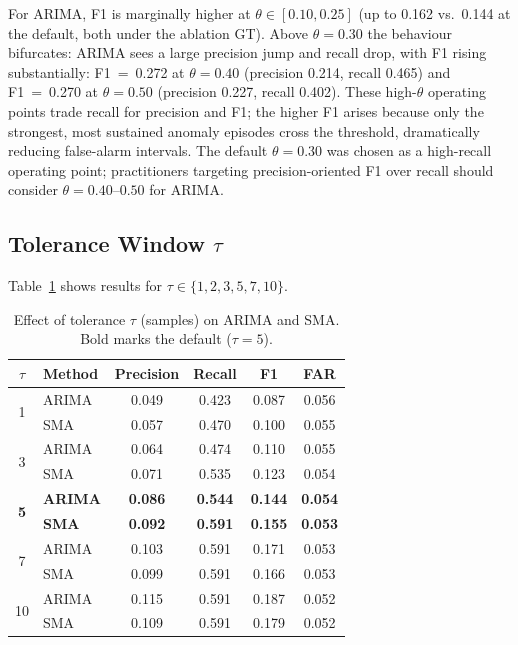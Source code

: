 \documentclass[pdflatex,sn-nature]{sn-jnl}
\theoremstyle{thmstyleone}%
\begin{document}
For ARIMA, F1 is marginally higher at $\theta \in [0.10, 0.25]$
(up to 0.162 vs.\ 0.144 at the default, both under the ablation GT).
Above $\theta = 0.30$ the behaviour bifurcates:
ARIMA sees a large precision jump and recall drop, with F1 rising substantially:
F1~=~0.272 at $\theta=0.40$ (precision 0.214, recall 0.465) and
F1~=~0.270 at $\theta=0.50$ (precision 0.227, recall 0.402).
These high-$\theta$ operating points trade recall for precision and F1;
the higher F1 arises because only the strongest, most sustained anomaly
episodes cross the threshold, dramatically reducing false-alarm intervals.
The default $\theta = 0.30$ was chosen as a high-recall operating point;
practitioners targeting precision-oriented F1 over recall should consider
$\theta = 0.40$--$0.50$ for ARIMA.

\subsection{Tolerance Window \texorpdfstring{$\tau$}{tau}}\label{sec:ablation:tau}

Table~\ref{tab:ablation_tau} shows results for $\tau \in \{1, 2, 3, 5, 7, 10\}$.

\begin{table}[tbp]
\centering
\begin{tabular}{clcccc}
\toprule
$\tau$ & Method & Precision & Recall & F1 & FAR \\
\midrule
\multirow{2}{*}{1}  & ARIMA & 0.049 & 0.423 & 0.087 & 0.056 \\
                    & SMA   & 0.057 & 0.470 & 0.100 & 0.055 \\
\multirow{2}{*}{3}  & ARIMA & 0.064 & 0.474 & 0.110 & 0.055 \\
                    & SMA   & 0.071 & 0.535 & 0.123 & 0.054 \\
\multirow{2}{*}{\textbf{5}}  & \textbf{ARIMA} & \textbf{0.086} & \textbf{0.544} & \textbf{0.144} & \textbf{0.054} \\
                    & \textbf{SMA}   & \textbf{0.092} & \textbf{0.591} & \textbf{0.155} & \textbf{0.053} \\
\multirow{2}{*}{7}  & ARIMA & 0.103 & 0.591 & 0.171 & 0.053 \\
                    & SMA   & 0.099 & 0.591 & 0.166 & 0.053 \\
\multirow{2}{*}{10} & ARIMA & 0.115 & 0.591 & 0.187 & 0.052 \\
                    & SMA   & 0.109 & 0.591 & 0.179 & 0.052 \\
\bottomrule
\end{tabular}
\caption{Effect of tolerance $\tau$ (samples) on ARIMA and SMA.
  Bold marks the default ($\tau = 5$).}
\label{tab:ablation_tau}
\end{table}
\end{document}
